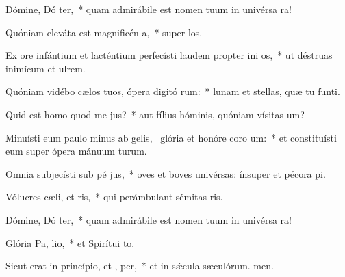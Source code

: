 \item Dómine, Dó ter,~* quam admirábile est nomen tuum in univérsa ra!
\item Quóniam eleváta est magnificén a,~* super los.
\item Ex ore infántium et lacténtium perfecísti laudem propter ini os,~* ut déstruas inimícum et ulrem.
\item Quóniam vidébo cælos tuos, ópera digitó rum:~* lunam et stellas, quæ tu funti.
\item Quid est homo quod me  jus?~* aut fílius hóminis, quóniam vísitas um?
\item Minuísti eum paulo minus ab gelis,~\pscross{} glória et honóre coro um:~* et constituísti eum super ópera mánuum turum.
\item Omnia subjecísti sub pé jus,~* oves et boves univérsas: ínsuper et pécora pi.
\item Vólucres cæli, et  ris,~* qui perámbulant sémitas ris.
\item Dómine, Dó ter,~* quam admirábile est nomen tuum in univérsa ra!
\item Glória Pa,  lio,~* et Spirítui to.
\item Sicut erat in princípio, et ,  per,~* et in sǽcula sæculórum. men.
